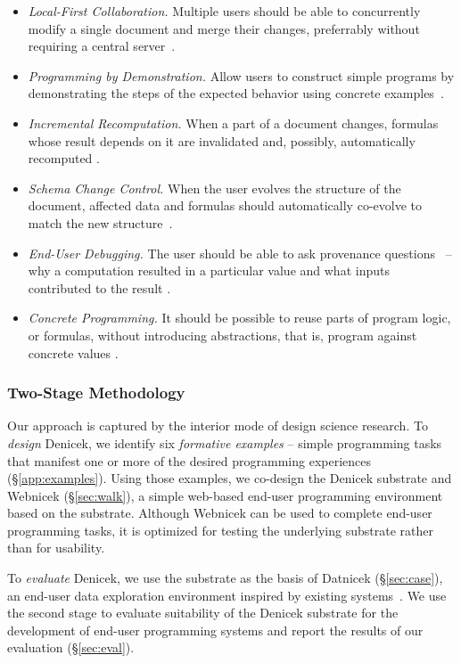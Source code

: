 \documentclass[sigconf,anonymous,screen]{acmart}
\begin{document}
\begin{itemize}
\item \emph{Local-First Collaboration.} Multiple users should be able to concurrently
  modify a single document and merge their changes, preferrably without requiring a central server~\cite{kleppmann-2019-local,litt-2022-peritext}.
\item \emph{Programming by Demonstration.} Allow users to construct simple programs by
  demonstrating the steps of the expected behavior using concrete examples~\cite{leiva-2021-rapido,cypher-1993-pbd}.
\item \emph{Incremental Recomputation.} When a part of a document changes, formulas whose result
  depends on it are invalidated and, possibly, automatically recomputed \cite{mcdirmid-2013-usable,horowitz-2023-engraft,petricek-2020-live}.
\item \emph{Schema Change Control.} When the user evolves the structure of the document, affected
  data and formulas should automatically co-evolve to match the new structure~\cite{litt-2020-cambria,edwards-2025-schema}.
\item \emph{End-User Debugging.} The user should be able to ask provenance questions~\cite{cheney-2009-provenance} --
  why a computation resulted in a particular value and what inputs contributed to the result \cite{ko-2009-whyline}.
\item \emph{Concrete Programming.} It should be possible to reuse parts of program logic, or formulas,
  without introducing abstractions, that is, program against concrete values \cite{edwards-2006-copypaste,edwards-2022-copypaste}.
\end{itemize}

\subsubsection*{Two-Stage Methodology}
Our approach is captured by the interior mode \cite{adam-2021-dsr} of design science research.
To \emph{design} Denicek, we identify six \emph{formative examples} -- simple programming
tasks that manifest one or more of the desired programming experiences (\S\ref{app:examples}).
Using those examples, we co-design the Denicek substrate and Webnicek (\S\ref{sec:walk}),
a simple web-based end-user programming environment based on the substrate. Although Webnicek can
be used to complete end-user programming tasks, it is optimized for testing the underlying
substrate rather than for usability.

To \emph{evaluate} Denicek, we use the substrate as the basis of Datnicek (\S\ref{sec:case}), an end-user data
exploration environment inspired by existing systems~\cite{kandel-2011-wrangler,drossos-2020-wrex}.
We use the second stage to evaluate suitability of the Denicek substrate for the development of
end-user programming systems and report the results of our evaluation (\S\ref{sec:eval}).
\end{document}
